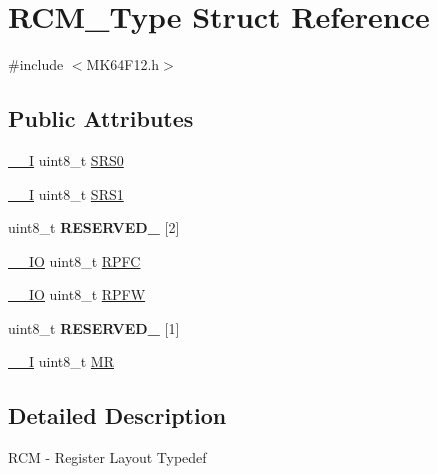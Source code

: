 \hypertarget{structRCM__Type}{}\section{R\+C\+M\+\_\+\+Type Struct Reference}
\label{structRCM__Type}


{\ttfamily \#include $<$M\+K64\+F12.\+h$>$}

\subsection*{Public Attributes}
\begin{DoxyCompactItemize}
\item 
\hyperlink{core__sc300_8h_af63697ed9952cc71e1225efe205f6cd3}{\+\_\+\+\_\+I} uint8\+\_\+t \hyperlink{structRCM__Type_a9e4e331c458808ec57a393932bf91e65}{S\+R\+S0}
\item 
\hyperlink{core__sc300_8h_af63697ed9952cc71e1225efe205f6cd3}{\+\_\+\+\_\+I} uint8\+\_\+t \hyperlink{structRCM__Type_a44780e402b18ebbbaec13d5a3694e523}{S\+R\+S1}
\item 
uint8\+\_\+t {\bfseries R\+E\+S\+E\+R\+V\+E\+D\+\_} \mbox{[}2\mbox{]}\hypertarget{structRCM__Type_ae065b1a7edea00b606bb3b80ab9affad}{}\label{structRCM__Type_ae065b1a7edea00b606bb3b80ab9affad}

\item 
\hyperlink{core__sc300_8h_aec43007d9998a0a0e01faede4133d6be}{\+\_\+\+\_\+\+IO} uint8\+\_\+t \hyperlink{structRCM__Type_ad0261f1d5010d46de000a3a9714b4c6d}{R\+P\+FC}
\item 
\hyperlink{core__sc300_8h_aec43007d9998a0a0e01faede4133d6be}{\+\_\+\+\_\+\+IO} uint8\+\_\+t \hyperlink{structRCM__Type_a449e78f6ff13d0f186b722a140027d6b}{R\+P\+FW}
\item 
uint8\+\_\+t {\bfseries R\+E\+S\+E\+R\+V\+E\+D\+\_} \mbox{[}1\mbox{]}\hypertarget{structRCM__Type_a89c9e452270e0b6aeef43f1bf080553e}{}\label{structRCM__Type_a89c9e452270e0b6aeef43f1bf080553e}

\item 
\hyperlink{core__sc300_8h_af63697ed9952cc71e1225efe205f6cd3}{\+\_\+\+\_\+I} uint8\+\_\+t \hyperlink{structRCM__Type_a546abcdcfe7309b51a89ae73612a02a0}{MR}
\end{DoxyCompactItemize}


\subsection{Detailed Description}
R\+CM -\/ Register Layout Typedef 

